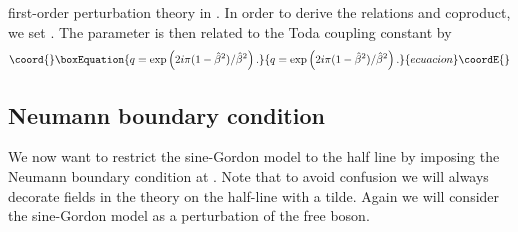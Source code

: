 \documentclass[a4paper,12pt]{article}
\providecommand{\hb}{\hat{\beta}}
\numberwithin{equation}{section}
\begin{document}
first-order perturbation theory in \cite{Ber91}. In order to
derive the \coordHE{} relations and coproduct, we set
\coordHE{}. The parameter \coordHE{} is then related to the Toda
coupling constant \myHighlight{$\hb$}\coordHE{} by
\begin{equation}\coord{}\boxEquation{\label{q}
  q=\exp\left(2i\pi(1-\hb^2)/\hb^2\right).
}{q=\exp\left(2i\pi(1-\hb^2)/\hb^2\right).
}{ecuacion}\coordE{}\end{equation}



\subsection{Neumann boundary condition\label{sectnbc}}

We now want to restrict the sine-Gordon model to the half line
\coordHE{} by imposing the Neumann boundary condition
\coordHE{} at \coordHE{}. Note that to avoid confusion
we will always decorate fields in the theory on the half-line with
a tilde. Again we will consider the sine-Gordon model as a
perturbation of the free boson.
\end{document}
